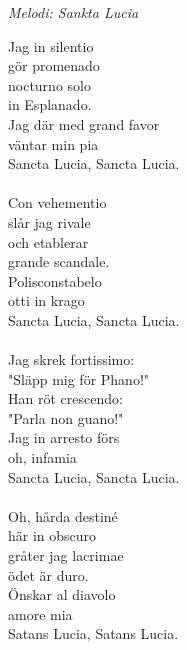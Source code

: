 {\footnotesize\textit{Melodi: Sankta Lucia}}\par
\vspace{10pt}
Jag in silentio\\
gör promenado\\
nocturno solo\\
in Esplanado.\\
Jag där med grand favor\\
väntar min pia\\
Sancta Lucia, Sancta Lucia.\\
\\
Con vehementio\\
slår jag rivale\\
och etablerar\\
grande scandale.\\
Polisconstabelo\\
otti in krago\\
Sancta Lucia, Sancta Lucia.\\
\\
Jag skrek fortissimo:\\
"Släpp mig för Phano!"\\
Han röt crescendo:\\
"Parla non guano!"\\
Jag in arresto förs\\
oh, infamia\\
Sancta Lucia, Sancta Lucia.\\
\\
Oh, hårda destiné\\
här in obscuro\\
gråter jag lacrimae\\
ödet är duro.\\
Önskar al diavolo\\
amore mia\\
Satans Lucia, Satans Lucia.
